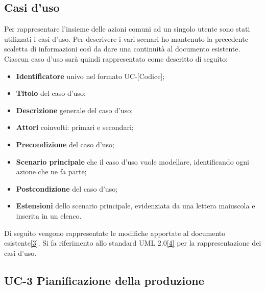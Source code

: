 
\subsection{Casi d'uso}

Per rappresentare l'insieme delle azioni comuni ad un singolo utente sono stati utilizzati i casi d'uso.
Per descrivere i vari scenari ho mantenuto la precedente scaletta di informazioni così da dare una continuità al documento esistente. 
Ciascun caso d'uso sarà quindi rappresentato come descritto di seguito:
\begin{itemize}
    \item \textbf{Identificatore} univo nel formato UC-[Codice];
    \item \textbf{Titolo} del caso d'uso;
    \item \textbf{Descrizione} generale del caso d'uso;
    \item \textbf{Attori} coinvolti: primari e secondari;
    \item \textbf{Precondizione} del caso d'uso;
    \item \textbf{Scenario principale} che il caso d'uso vuole modellare, identificando ogni azione che ne fa parte;
    \item \textbf{Postcondizione} del caso d'uso;
    \item \textbf{Estensioni} dello scenario principale, evidenziata da una lettera maiuscola e inserita in un elenco.
\end{itemize}

Di seguito vengono rappresentate le modifiche apportate al documento esistente\hyperref[analisi-requisiti]{[3]}.
Si fa riferimento allo standard UML 2.0\hyperref[uml]{[4]} per la rappresentazione dei casi d'uso.

\subsection*{UC-3 Pianificazione della produzione}

